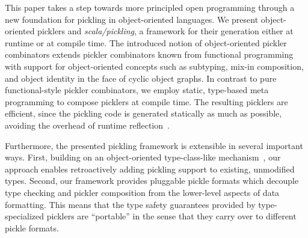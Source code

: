 This paper takes a step towards more principled open programming through a new
foundation for pickling in object-oriented languages. We present object-oriented
picklers and \textit{scala/pickling}, a framework for their generation either at runtime or at
compile time. The introduced notion of object-oriented pickler combinators
extends pickler combinators known from functional
programming~\cite{Kennedy2004} with support for object-oriented concepts such
as subtyping, mix-in composition,  and object identity in the face of cyclic
object graphs. In contrast to pure functional-style
pickler combinators, we employ static, type-based meta programming to compose
picklers at compile time. The resulting picklers are efficient, since the
pickling code is generated statically as much as possible, avoiding the
overhead of runtime reflection~\cite{Gil2008,Dubochet2011}.

Furthermore, the presented pickling framework is extensible in several
important ways. First, building on an object-oriented type-class-like
mechanism~\cite{Oliveira2010}, our approach enables retroactively adding
pickling support to existing, unmodified types. Second, our framework provides
pluggable pickle formats which decouple type checking and pickler composition
from the lower-level aspects of data formatting. This means that the type
safety guarantees provided by type-specialized picklers are ``portable'' in
the sense that they carry over to different pickle formats.

